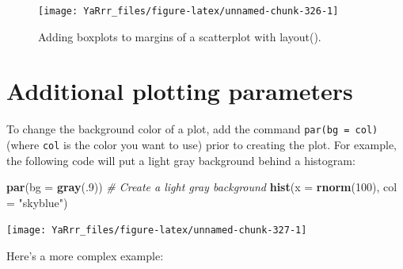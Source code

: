 \documentclass[]{book}
\newenvironment{Shaded}{\begin{snugshade}}{\end{snugshade}}
\newcommand{\KeywordTok}[1]{\textcolor[rgb]{0.13,0.29,0.53}{\textbf{#1}}}
\newcommand{\DataTypeTok}[1]{\textcolor[rgb]{0.13,0.29,0.53}{#1}}
\newcommand{\DecValTok}[1]{\textcolor[rgb]{0.00,0.00,0.81}{#1}}
\newcommand{\StringTok}[1]{\textcolor[rgb]{0.31,0.60,0.02}{#1}}
\newcommand{\CommentTok}[1]{\textcolor[rgb]{0.56,0.35,0.01}{\textit{#1}}}
\newcommand{\NormalTok}[1]{#1}
\theoremstyle{definition}
\theoremstyle{definition}
\theoremstyle{remark}
\begin{document}
\begin{figure}

{\centering \texttt{[image: YaRrr\_files/figure-latex/unnamed-chunk-326-1]} 

}

\caption{Adding boxplots to margins of a scatterplot with layout().}\label{fig:unnamed-chunk-326}
\end{figure}

\section{Additional plotting
parameters}\label{additional-plotting-parameters}

To change the background color of a plot, add the command
\texttt{par(bg\ =\ col)} (where \texttt{col} is the color you want to
use) prior to creating the plot. For example, the following code will
put a light gray background behind a histogram:

\begin{Shaded}
\begin{Highlighting}[]
\KeywordTok{par}\NormalTok{(}\DataTypeTok{bg =} \KeywordTok{gray}\NormalTok{(.}\DecValTok{9}\NormalTok{)) }\CommentTok{# Create a light gray background}
\KeywordTok{hist}\NormalTok{(}\DataTypeTok{x =} \KeywordTok{rnorm}\NormalTok{(}\DecValTok{100}\NormalTok{), }\DataTypeTok{col =} \StringTok{"skyblue"}\NormalTok{)}
\end{Highlighting}
\end{Shaded}

\begin{center}\texttt{[image: YaRrr\_files/figure-latex/unnamed-chunk-327-1]} \end{center}

Here's a more complex example:
\end{document}
